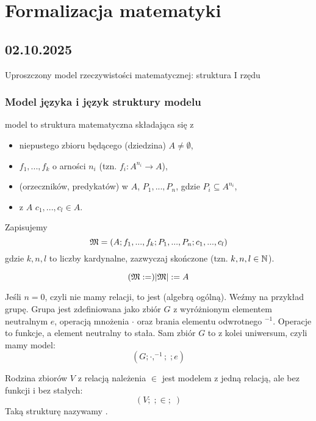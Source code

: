 \chapter{Formalizacja matematyki}

\section{02.10.2025}{Uproszczony model rzeczywistości matematycznej: struktura I rzędu}

\subsection{Model języka i język struktury modelu}

\begin{definition}{model}{}
   to struktura matematyczna składająca się z
  \begin{itemize}
    \item niepustego zbioru będącego  (dziedzina) $A\neq\emptyset$,
    \item {} $f_1,..., f_k$ o arności $n_i$ (tzn. $f_i:A^{n_i}\to A$),
    \item {} (orzeczników, predykatów) w $A$, $P_1,..., P_n$, gdzie $P_i\subseteq A^{n_i}$,
    \item {} z $A$ $c_1,..., c_l\in A$.
  \end{itemize}
\end{definition}

Zapisujemy
$$\mathfrak{M}=(A; f_1,...,f_k; P_1,...,P_n; c_1,...,c_l)$$
gdzie $k,n,l$ to liczby kardynalne, zazwyczaj skończone (tzn. $k,n,l\in\mathbb{N}$).

\begin{konwencja}{}{}
  $$(\mathfrak{M}:=)|\mathfrak{M}|:=A$$
\end{konwencja}

\begin{example}[m]
\item Jeśli $n=0$, czyli nie mamy relacji, to \Mm{} jest  (algebrą ogólną). Weźmy na przykład grupę. Grupa jest zdefiniowana jako zbiór $G$ z wyróżnionym elementem neutralnym $e$, operacją mnożenia $\cdot$ oraz brania elementu odwrotnego $^{-1}$. Operacje to funkcje, a element neutralny to stała. Sam zbiór $G$ to z kolei uniwersum, czyli mamy model:
  $$(G; \cdot, ^{-1};\;;e)$$
\item Rodzina zbiorów $V$ z relacją należenia $\in$ jest modelem z jedną relacją, ale bez funkcji i bez stałych:
  $$(V;\;;\in;\;)$$
  Taką strukturę nazywamy .
\end{example}

